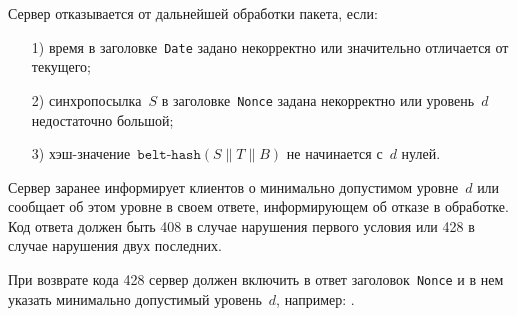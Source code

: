 Сервер отказывается от дальнейшей обработки пакета, если:
\begin{enumerate}
\item[1)] 
время в заголовке~\texttt{Date} задано некорректно или значительно 
отличается от текущего;
\item[2)] 
синхропосылка~$S$ в заголовке~\texttt{Nonce} задана некорректно или 
уровень~$d$ недостаточно большой;
\item[3)] 
хэш-значение~$\texttt{belt-hash}(S\parallel T\parallel B)$ не начинается 
с~$d$ нулей.
\end{enumerate}

Сервер заранее информирует клиентов о минимально допустимом уровне~$d$
или сообщает об этом уровне в своем ответе, информирующем об отказе 
в обработке. Код ответа должен быть 408 в случае нарушения первого 
условия или 428 в случае нарушения двух последних.

При возврате кода 428 сервер должен включить в ответ 
заголовок~\texttt{Nonce} и в нем указать минимально допустимый 
уровень~$d$, например: .

